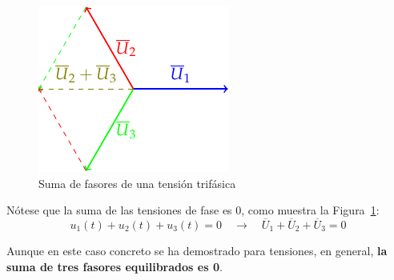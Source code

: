     \begin{figure}
		\centering
		\includegraphics{../figs/FasoresSumaCero.pdf}
		\caption{Suma de fasores de una tensión trifásica}
		\label{fig:fasoressumacero}
	\end{figure}

    \newpage

    \vspace*{3mm}
    Nótese que la suma de las tensiones de fase es 0, como muestra la Figura~\ref{fig:fasoressumacero}:
	\begin{equation*}
		u_1(t) + u_2(t) + u_3(t) = 0 \quad\rightarrow\quad \overline{U}_1 + \overline{U}_2 + \overline{U}_3 = 0
	\end{equation*}
	
	\begin{remark}
	    Aunque en este caso concreto se ha demostrado para tensiones, en general, \textbf{la suma de tres fasores equilibrados es 0}.
	\end{remark}
	
